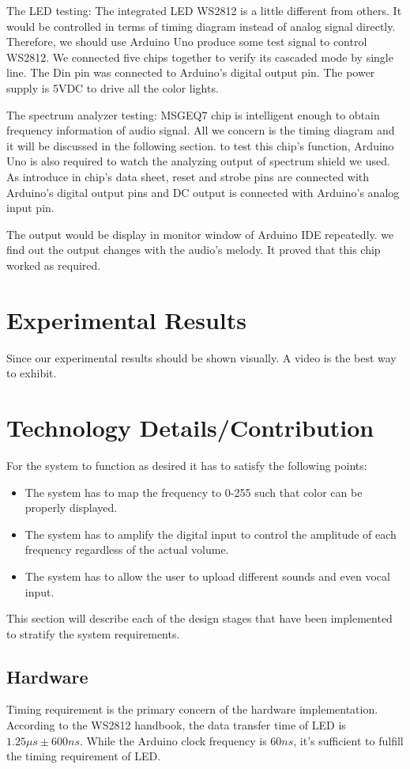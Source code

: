 \documentclass[12pt,a4paper,journal]{IEEEtran}
\begin{document}
The LED testing: The integrated LED WS2812 is a little different from others. It would be controlled in terms of timing diagram instead of analog signal directly. Therefore, we should use Arduino Uno produce some test signal to control WS2812. We connected five chips together to verify its cascaded mode by single line. The Din pin was connected to Arduino's digital output pin. The power supply is 5VDC to drive all the color lights.

The spectrum analyzer testing: MSGEQ7 chip is intelligent enough to obtain frequency information of audio signal. All we concern is the timing diagram and it will be discussed in the following section. to test this chip's function, Arduino Uno is also required to watch the analyzing output of spectrum shield we used. As introduce in chip's data sheet, reset and strobe pins are connected with Arduino's digital output pins and DC output is connected with Arduino's analog input pin.

The output would be display in monitor window of Arduino IDE repeatedly. we find out the output changes with the audio's melody. It proved that this chip worked as required. 

\section{Experimental Results}

Since our experimental results should be shown visually. A video is the best way to exhibit.  

\section{Technology Details/Contribution}
For the system to function as desired it has to satisfy the following points:
\begin{itemize}
\item The system has to map the frequency to 0-255 such that color can be properly displayed.
\item The system has to amplify the digital input to control the amplitude of each frequency regardless of the actual volume.
\item The system has to allow the user to upload different sounds and even vocal input.
\end{itemize}
This section will describe each of the design stages that have been implemented to stratify the system requirements. 
\renewcommand{\thesubsection}{\thesection.\Alph{subsection}}
\subsection{Hardware}
Timing requirement is the primary concern of the hardware implementation. According to the WS2812 handbook, the data transfer time of LED is $1.25\mu s \pm 600ns$. While the Arduino clock frequency is $60ns$, it's sufficient to fulfill the timing requirement of LED.
\end{document}
